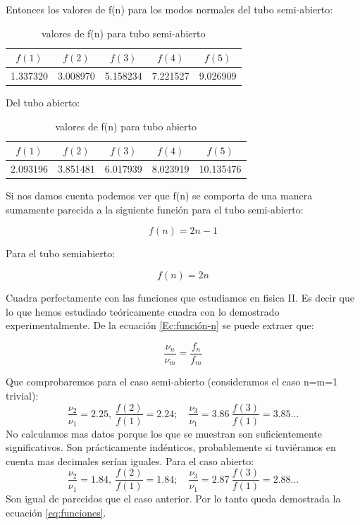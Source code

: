 \documentclass[12pt,a4paper]{article}
\begin{document}
Entonces los valores de f(n) para los modos normales del tubo semi-abierto:  \\

\begin{table}[h!]\centering
\begin{tabular}{|c|c|c|c|c|}
\hline  
 $f(1)$ 	 & $f(2)$ 	 & $f(3)$ 	 & $f(4)$ 	 & $f(5)$ \\ \hline 
1.337320 	 & 3.008970 	 & 5.158234 	 & 7.221527 	 & 9.026909 	 \\
 \hline 
\end{tabular}
\caption{valores de f(n) para tubo semi-abierto}
\end{table}

Del tubo abierto: 
\begin{table}[h!]\centering
\begin{tabular}{|c|c|c|c|c|}
\hline  
 $f(1)$ 	 & $f(2)$ 	 & $f(3)$ 	 & $f(4)$ 	 & $f(5)$ \\ \hline 
2.093196 	 & 3.851481 	 & 6.017939 	 & 8.023919 	 & 10.135476 \\
 \hline 
\end{tabular}
\caption{valores de f(n) para tubo abierto}
\end{table}



Si nos damos cuenta podemos ver que f(n) se comporta de una manera sumamente parecida a la siguiente función para el tubo semi-abierto:  

\begin{equation}
f(n) = 2n-1
\end{equation}

Para el tubo semiabierto: 

\begin{equation}
f(n) = 2n
\end{equation}

Cuadra perfectamente con las funciones que estudiamos en fisica II. Es decir que lo que hemos estudiado teóricamente cuadra con lo demostrado experimentalmente. De la ecuación \ref{Ec:función-n} se puede extraer que:

\begin{equation}
\dfrac{\nu_n}{\nu_m} = \dfrac{f_n}{f_m}
\label{eq:funciones}
\end{equation}

Que comprobaremos para el caso semi-abierto (consideramos el caso n=m=1 trivial):
$$ \dfrac{\nu_2}{\nu_1}=2.25, \ \dfrac{f(2)}{f(1)}=2.24 ; \quad \dfrac{\nu_3}{\nu_1}=3.86  \ \dfrac{f(3)}{f(1)}=3.85 \ldots $$
No calculamos mas datos porque los que se muestran son suficientemente significativos. Son prácticamente indénticos, probablemente si tuviéramos en cuenta mas decimales serían iguales. Para el caso abierto:
$$ \dfrac{\nu_2}{\nu_1}=1.84, \ \dfrac{f(2)}{f(1)}=1.84 ; \quad \dfrac{\nu_3}{\nu_1}=2.87  \ \dfrac{f(3)}{f(1)}=2.88 \ldots$$
Son igual de parecidos que el caso anterior. Por lo tanto queda demostrada la ecuación \ref{eq:funciones}.
\end{document}
